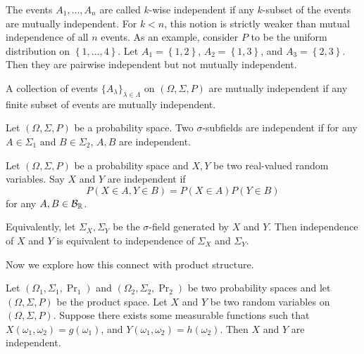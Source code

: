 \documentclass[a4paper]{article}
\begin{document}
\begin{remark}
  The events $A_1, \dots, A_n$ are called $k$-wise independent if
  any $k$-subset of the events are mutually independent. For $k < n$,
  this notion is strictly weaker than mutual independence of all
  $n$ events. As an example, consider $P$ to be the uniform distribution
  on $\left\{ 1, \dots, 4 \right\}$. Let $A_1 = \left\{ 1, 2 \right\}$,
  $A_2 = \left\{ 1, 3 \right\}$, and $A_3 = \left\{ 2, 3 \right\}$.
  Then they are pairwise independent but not mutually independent.
\end{remark}

\begin{defi}
  A collection of events $\{A_\lambda\}_{\lambda \in \Lambda}$
  on $(\Omega, \Sigma, P)$ are mutually independent if any finite subset
  of events are mutually independent.
\end{defi}

\begin{defi}
  Let $(\Omega, \Sigma, P)$ be a probability space. Two
  $\sigma$-subfields are independent if for any $A \in \Sigma_1$
  and $B \in \Sigma_2$, $A, B$ are independent.
\end{defi}

\begin{defi}
  Let $(\Omega, \Sigma, P)$ be a probability space and
  $X, Y$ be two real-valued random variables. Say $X$ and $Y$
  are independent if
  \[
  P \left( X \in A, Y \in B \right) = P \left( X \in A \right)
  P \left( Y \in B \right)
  \]
  for any $A, B \in \mathcal{B}_{\mathbb{R}}$.

  Equivalently, let $\Sigma_X, \Sigma_Y$
  be the $\sigma$-field generated by $X$ and $Y$. Then independence of
  $X$ and $Y$ is equivalent to independence of $\Sigma_X$ and $\Sigma_Y$.
\end{defi}

Now we explore how this connect with product structure.

\begin{prop}
  Let $(\Omega_1, \Sigma_1, \Pr_1)$ and $(\Omega_2, \Sigma_2, \Pr_2)$
  be two probability spaces and let $(\Omega, \Sigma, P)$ be the
  product space. Let $X$ and $Y$ be two random variables on
  $(\Omega, \Sigma, P)$. Suppose there exists some measurable
  functions such that $X (\omega_1, \omega_2) = g(\omega_1)$,
  and $Y(\omega_1, \omega_2) = h (\omega_2)$. Then $X$ and $Y$ are
  independent.
\end{prop}
\end{document}
